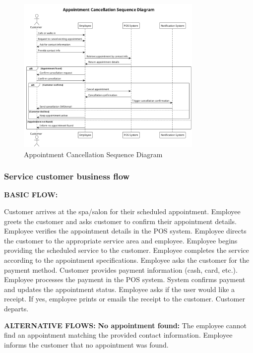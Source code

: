 \documentclass[]{VUMIFTemplateClass}
\begin{document}
\begin{figure}[H]
    \centering
    \includegraphics[width=0.8\textwidth]{images/diagrams/services/appointment_cancellation_sequence.png}
    \caption{Appointment Cancellation Sequence Diagram}
    \label{fig:appointment_cancellation_sequence}
\end{figure}

\subsubsection{Service customer business flow}

\textbf{BASIC FLOW:}

Customer arrives at the spa/salon for their scheduled appointment.
Employee greets the customer and asks customer to confirm their appointment details.
Employee verifies the appointment details in the POS system.
Employee directs the customer to the appropriate service area and employee.
Employee begins providing the scheduled service to the customer.
Employee completes the service according to the appointment specifications.
Employee asks the customer for the payment method.
Customer provides payment information (cash, card, etc.).
Employee processes the payment in the POS system.
System confirms payment and updates the appointment status.
Employee asks if the user would like a receipt.
If yes, employee prints or emails the receipt to the customer.
Customer departs.

\textbf{ALTERNATIVE FLOWS:}
\textbf{No appointment found: } The employee cannot find an appointment matching the provided contact information.
Employee informs the customer that no appointment was found.
\end{document}
